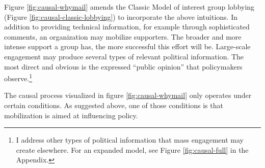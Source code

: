 Figure \ref{fig:causal-whymail} amends the Classic Model of interest group lobbying (Figure \ref{fig:causal-classic-lobbying}) to incorporate the above intuitions. In addition to providing technical information, for example through sophisticated comments, an organization may mobilize supporters. The broader and more intense support a group has, the more successful this effort will be. Large-scale engagement may produce several types of relevant political information. The most direct and obvious is the expressed ``public opinion'' that policymakers observe.\footnote{I address other types of political information that mass engagement may create elsewhere. For an expanded model, see Figure \ref{fig:causal-full} in the Appendix.}



The causal process visualized in figure \ref{fig:causal-whymail} only operates under certain conditions. 
As suggested above, one of those conditions is that mobilization is aimed at influencing policy. 
